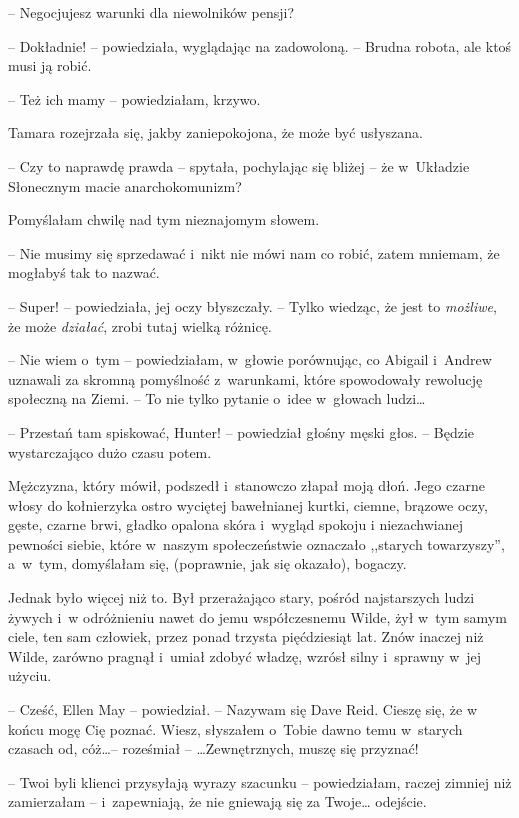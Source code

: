 \documentclass[oneside,polish,11pt,sfheadings]{mwbk}
\begin{document}
-- Negocjujesz warunki dla niewolników pensji?

-- Dokładnie! -- powiedziała, wyglądając na zadowoloną. -- Brudna robota,
ale ktoś musi ją robić.

-- Też ich mamy -- powiedziałam, krzywo.

Tamara rozejrzała się, jakby zaniepokojona, że może być usłyszana.

-- Czy to naprawdę prawda -- spytała, pochylając się bliżej -- że w~Układzie Słonecznym macie anarchokomunizm?

Pomyślałam chwilę nad tym nieznajomym słowem. 

-- Nie musimy się
sprzedawać i~nikt nie mówi nam co robić, zatem mniemam, że mogłabyś tak
to nazwać.

-- Super! -- powiedziała, jej oczy błyszczały. -- Tylko wiedząc, że jest to
\textit{możliwe}, że może \textit{działać}, zrobi tutaj wielką różnicę.

-- Nie wiem o~tym -- powiedziałam, w~głowie porównując, co Abigail i~Andrew uznawali za skromną pomyślność z~warunkami, które spowodowały
rewolucję społeczną na Ziemi. -- To nie tylko pytanie o~idee w~głowach
ludzi\ldots 

-- Przestań tam spiskować, Hunter! -- powiedział głośny męski głos. -- Będzie wystarczająco dużo czasu potem.

Mężczyzna, który mówił, podszedł i~stanowczo złapał moją dłoń. Jego
czarne włosy do kołnierzyka ostro wyciętej bawełnianej kurtki, ciemne,
brązowe oczy, gęste, czarne brwi, gładko opalona skóra i~wygląd spokoju
i niezachwianej pewności siebie, które w~naszym społeczeństwie oznaczało
,,starych towarzyszy'', a~w~tym, domyślałam się, (poprawnie, jak się
okazało), bogaczy.

Jednak było więcej niż to. Był przerażająco stary, pośród najstarszych
ludzi żywych i~w odróżnieniu nawet do jemu współczesnemu Wilde, żył w~tym samym ciele, ten sam człowiek, przez ponad trzysta pięćdziesiąt lat.
Znów inaczej niż Wilde, zarówno pragnął i~umiał zdobyć władzę, wzrósł
silny i~sprawny w~jej użyciu.

-- Cześć, Ellen May -- powiedział. -- Nazywam się Dave Reid. Cieszę się, że
w końcu mogę Cię poznać. Wiesz, słyszałem o~Tobie dawno temu w~starych
czasach od, cóż\ldots  -- roześmiał -- \ldots  Zewnętrznych, muszę się przyznać!

-- Twoi byli klienci przysyłają wyrazy szacunku -- powiedziałam, raczej
zimniej niż zamierzałam -- i~zapewniają, że nie gniewają się za Twoje\ldots 
odejście.
\end{document}
